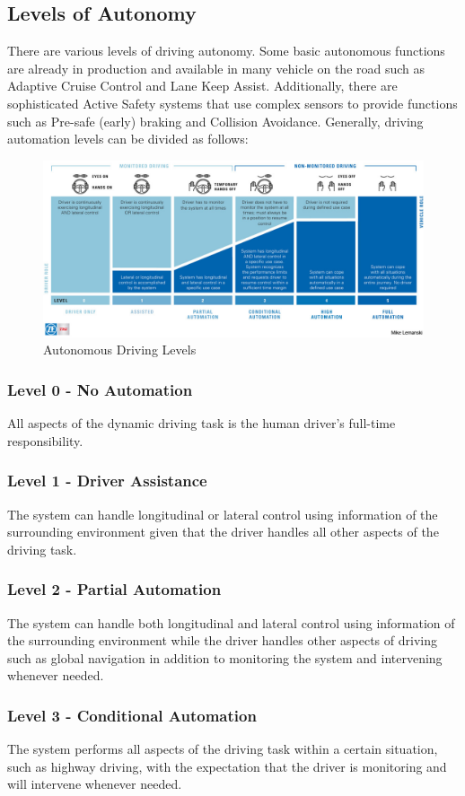 \subsection{Levels of Autonomy}
There are various levels of driving autonomy. Some basic autonomous functions are already in production and available in many vehicle on the road such as Adaptive Cruise Control and Lane Keep Assist. Additionally, there are sophisticated Active Safety systems that use complex sensors to provide functions such as Pre-safe (early) braking and Collision Avoidance. Generally, driving automation levels can be divided as follows:
\begin{figure}[ht]
\includegraphics[trim={0 1.7cm 0 0},clip,width=\linewidth]{Figures/AutomatedDrivingLevels.jpg}
\caption{Autonomous Driving Levels}
\end{figure}
\subsubsection{Level 0 - No Automation}
All aspects of the dynamic driving task is the human driver's full-time responsibility.
\subsubsection{Level 1 - Driver Assistance}
The system can handle longitudinal or lateral control using information of the surrounding environment given that the driver handles all other aspects of the driving task.
\subsubsection{Level 2 - Partial Automation}
The system can handle both longitudinal and lateral control using information of the surrounding environment while the driver handles other aspects of driving such as global navigation in addition to monitoring the system and intervening whenever needed.
\subsubsection{Level 3 - Conditional Automation}
The system performs all aspects of the driving task within a certain situation, such as highway driving, with the expectation that the driver is monitoring and will intervene whenever needed.
